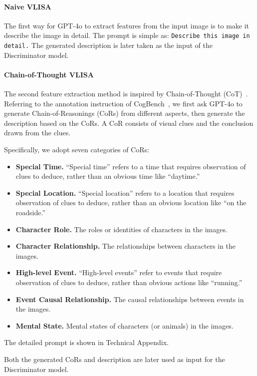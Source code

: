 \paragraph{Naive VLISA}

The first way for GPT-4o to extract features from the input image is to make it describe the image in detail.
The prompt is simple as: 
\texttt{Describe this image in detail.} 
The generated description is later taken as the input of the Discriminator model.

\paragraph{Chain-of-Thought VLISA}  %

The second feature extraction method is inspired by Chain-of-Thought (CoT)~\cite{cot2024}. 
Referring to the annotation instruction of CogBench~\cite{song2024cognitive}, we first ask GPT-4o to generate Chain-of-Reasonings (CoRs) from different aspects, then generate the description based on the CoRs. 
A CoR consists of visual clues and the conclusion drawn from the clues.

Specifically, we adopt seven categories of CoRs:  %

\begin{itemize}
    \item \textbf{Special Time.} ``Special time'' refers to a time that requires observation of clues to deduce, rather than an obvious time like ``daytime.''
    \item \textbf{Special Location.} ``Special location'' refers to a location that requires observation of clues to deduce, rather than an obvious location like ``on the roadside.''
    \item \textbf{Character Role.} The roles or identities of characters in the images.
    \item \textbf{Character Relationship.} The relationships between characters in the images.
    \item \textbf{High-level Event.} ``High-level events'' refer to events that require observation of clues to deduce, rather than obvious actions like ``running.''
    \item \textbf{Event Causal Relationship.} The causal relationships between events in the images.
    \item \textbf{Mental State.} Mental states of characters (or animals) in the images.
\end{itemize}

The detailed prompt is shown in Technical Appendix.


Both the generated CoRs and description are later used as input for the Discriminator model.